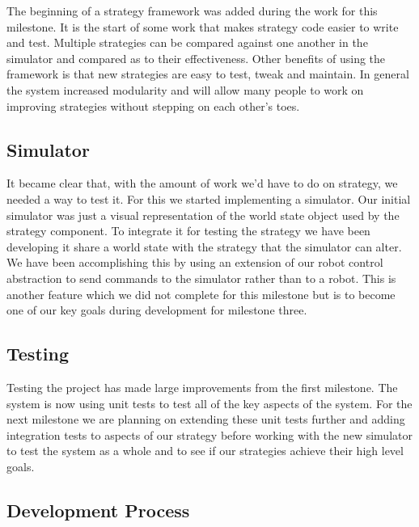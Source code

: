 \documentclass[12pt, a4paper, titlepage]{article}
\begin{document}
The beginning of a strategy framework was added during the work for this
milestone. It is the start of some work that makes strategy code easier to
write and test. Multiple strategies can be compared against one another in
the simulator and compared as to their effectiveness. Other benefits of using
the framework is that new strategies are easy to test, tweak and maintain. In
general the system increased modularity and will allow many people to work on
improving strategies without stepping on each other’s toes.

\subsection{Simulator}

It became clear that, with the amount of work we’d have to do on strategy,
we needed a way to test it. For this we started implementing a simulator. Our
initial simulator was just a visual representation of the world state object
used by the strategy component. To integrate it for testing the strategy we have
been developing it share a world state with the strategy that the simulator
can alter. We have been accomplishing this by using an extension of our robot
control abstraction to send commands to the simulator rather than to a robot.
This is another feature which we did not complete for this milestone but is to
become one of our key goals during development for milestone three.

\subsection{Testing}

Testing the project has made large improvements from the first milestone. The
system is now using unit tests to test all of the key aspects of the system. For
the next milestone we are planning on extending these unit tests further and
adding integration tests to aspects of our strategy before working with the new
simulator to test the system as a whole and to see if our strategies achieve
their high level goals.

\subsection{Development Process}
\end{document}

